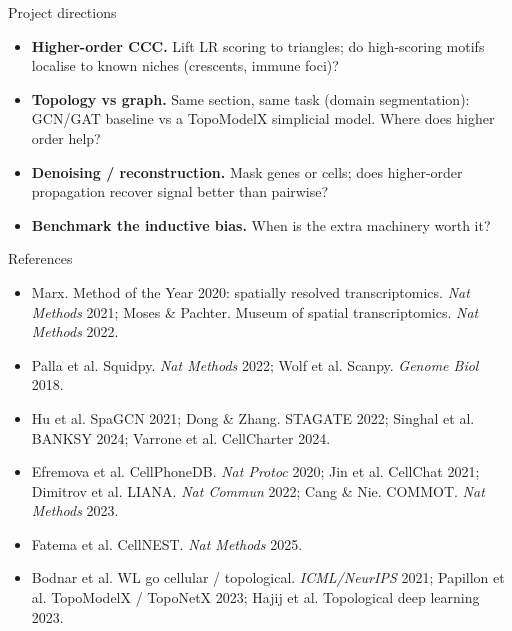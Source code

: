 \documentclass[aspectratio=169]{beamer}
\begin{document}

\begin{frame}{Project directions}
  \begin{itemize}
    \item \textbf{Higher-order CCC.} Lift LR scoring to triangles; do high-scoring motifs
      localise to known niches (crescents, immune foci)?
    \item \textbf{Topology vs graph.} Same section, same task (domain segmentation): GCN/GAT
      baseline vs a TopoModelX simplicial model. Where does higher order help?
    \item \textbf{Denoising / reconstruction.} Mask genes or cells; does higher-order
      propagation recover signal better than pairwise?
    \item \textbf{Benchmark the inductive bias.} When is the extra machinery worth it?
  \end{itemize}
\end{frame}

\begin{frame}{References}
  \scriptsize
  \begin{itemize}
    \item Marx. Method of the Year 2020: spatially resolved transcriptomics. \emph{Nat Methods} 2021;
      Moses \& Pachter. Museum of spatial transcriptomics. \emph{Nat Methods} 2022.
    \item Palla et al. Squidpy. \emph{Nat Methods} 2022; Wolf et al. Scanpy. \emph{Genome Biol} 2018.
    \item Hu et al. SpaGCN 2021; Dong \& Zhang. STAGATE 2022; Singhal et al. BANKSY 2024;
      Varrone et al. CellCharter 2024.
    \item Efremova et al. CellPhoneDB. \emph{Nat Protoc} 2020; Jin et al. CellChat 2021;
      Dimitrov et al. LIANA. \emph{Nat Commun} 2022; Cang \& Nie. COMMOT. \emph{Nat Methods} 2023.
    \item Fatema et al. CellNEST. \emph{Nat Methods} 2025.
    \item Bodnar et al. WL go cellular / topological. \emph{ICML/NeurIPS} 2021;
      Papillon et al. TopoModelX / TopoNetX 2023; Hajij et al. Topological deep learning 2023.
  \end{itemize}
\end{frame}
\end{document}
